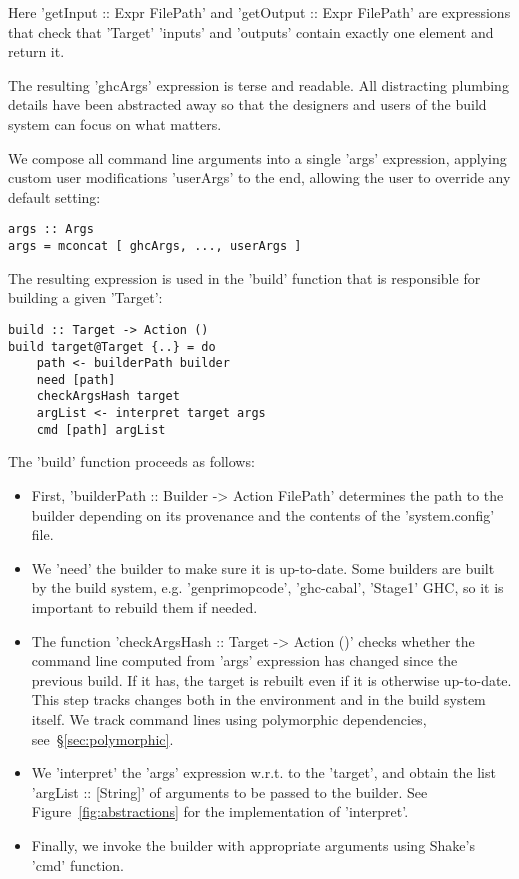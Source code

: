 \noindent Here \lst'getInput :: Expr FilePath' and
\lst'getOutput :: Expr FilePath' are expressions that check that
\lst'Target' \lst'inputs' and \lst'outputs' contain exactly one element and
return it.

The resulting \lst'ghcArgs' expression is terse and readable. All
distracting plumbing details have been abstracted away so that the designers and
users of the build system can focus on what matters.


We compose all command line arguments into a single \lst'args' expression,
applying custom user modifications \lst'userArgs' to the end,
allowing the user to override any default setting:

\begin{lstlisting}
args :: Args
args = mconcat [ ghcArgs, ..., userArgs ]
\end{lstlisting}

\noindent The resulting expression is used in the \lst'build' function that is
responsible for building a given \lst'Target':

\begin{lstlisting}
build :: Target -> Action ()
build target@Target {..} = do
    path <- builderPath builder
    need [path]
    checkArgsHash target
    argList <- interpret target args
    cmd [path] argList
\end{lstlisting}

\noindent The \lst'build' function proceeds as follows:
\begin{itemize}
  \item First, \lst'builderPath :: Builder -> Action FilePath' determines the
  path to the builder depending on its provenance and the contents of the
  \lst'system.config' file.
  \item We \lst'need' the builder to make sure it is up-to-date. Some builders
  are built by the build system, e.g. \lst'genprimopcode',
  \lst'ghc-cabal', \lst'Stage1' GHC, so it is important to rebuild them if needed.
  \item The function \lst'checkArgsHash :: Target -> Action ()' checks whether the
  command line computed from \lst'args' expression has changed since the
  previous build. If it has, the target is rebuilt even if it is otherwise
  up-to-date. This step tracks changes both in the environment and in the build
  system itself. We track command lines using polymorphic dependencies,
  see~\S\ref{sec:polymorphic}.
  \item We \lst'interpret' the \lst'args' expression w.r.t. to the
  \lst'target', and obtain the list \lst'argList :: [String]' of arguments to be
  passed to the builder. See Figure~\ref{fig:abstractions} for the implementation of
  \lst'interpret'.
  \item Finally, we invoke the builder with appropriate arguments using Shake's
  \lst'cmd' function.
\end{itemize}

